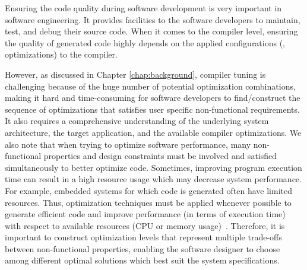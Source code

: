 Ensuring the code quality during software development is very important in software engineering. It provides facilities to the software developers to maintain, test, and debug their source code. 
When it comes to the compiler level, ensuring the quality of generated code highly depends on the applied configurations (\ie, optimizations) to the compiler. %

However, as discussed in Chapter \ref{chap:background}, compiler tuning is challenging because of the huge number of potential optimization combinations, making it hard and time-consuming for software developers to find/construct the sequence of optimizations that satisfies user specific non-functional requirements. It also requires a comprehensive understanding of the underlying system architecture, the target application, and the available compiler optimizations.
We also note that when trying to optimize software performance, many non-functional properties and design constraints must be involved and satisfied simultaneously to better optimize code. Sometimes, improving program execution time can result in a high resource usage which may decrease system performance. For example, embedded systems for which code is generated often have limited resources. Thus, optimization techniques must be applied whenever possible to generate efficient code and improve performance (in terms of execution time) with respect to available resources (CPU or memory usage)~\cite{nagiub2013automatic}.
Therefore, it is important to construct optimization levels that represent multiple trade-offs between non-functional properties, enabling the software designer to choose among different optimal solutions which best suit the system specifications.

